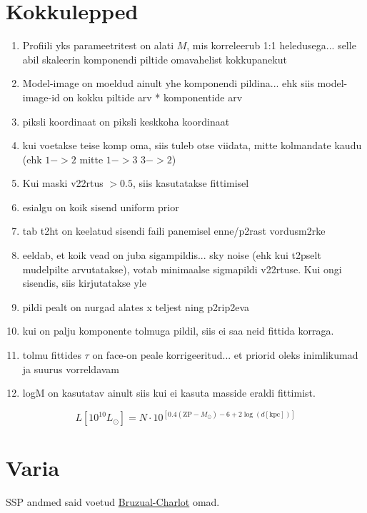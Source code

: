 \documentclass{article}
\begin{document}
	\section{Kokkulepped} %
	\label{sec:kokkulepped}
	\begin{enumerate}
		\item Profiili yks parameetritest on alati $M$, mis korreleerub 1:1 heledusega... selle abil skaleerin komponendi piltide omavahelist kokkupanekut
		\item Model-image on moeldud ainult yhe komponendi pildina... ehk siis model-image-id on kokku piltide arv * komponentide arv
		\item piksli koordinaat on piksli keskkoha koordinaat
		\item kui voetakse teise komp oma, siis tuleb otse viidata, mitte kolmandate kaudu (ehk $1->2$ mitte $1->3$ $3->2$)
		\item Kui maski v22rtus $>0.5$, siis kasutatakse fittimisel
		\item esialgu on koik sisend uniform prior
		\item tab t2ht on keelatud sisendi faili panemisel enne/p2rast vordusm2rke
		\item eeldab, et koik vead on juba sigampildis... sky noise (ehk kui t2pselt mudelpilte arvutatakse), votab minimaalse sigmapildi v22rtuse. Kui ongi sisendis, siis kirjutatakse yle
		\item pildi pealt on nurgad alates x teljest ning p2rip2eva
		\item kui on palju komponente tolmuga pildil, siis ei saa neid fittida korraga.
		\item tolmu fittides $\tau$ on face-on peale korrigeeritud... et priorid oleks inimlikumad ja suurus vorreldavam
		\item logM on kasutatav ainult siis kui ei kasuta masside eraldi fittimist.
	\end{enumerate}
	\begin{equation}
		L\left[ 10^{10}L_\odot \right] = N\cdot10^{\left[ 0.4(\mathrm{ZP}-M_\odot) -6 + 2\log(d[\mathrm{kpc}]) \right]}
	\end{equation}
	
	\section{Varia} %
	\label{sec:varia}
	
	SSP andmed said voetud \href{http://www.bruzual.org/bc03/Updated_version_2016/}{Bruzual-Charlot} omad.
	
\end{document}
